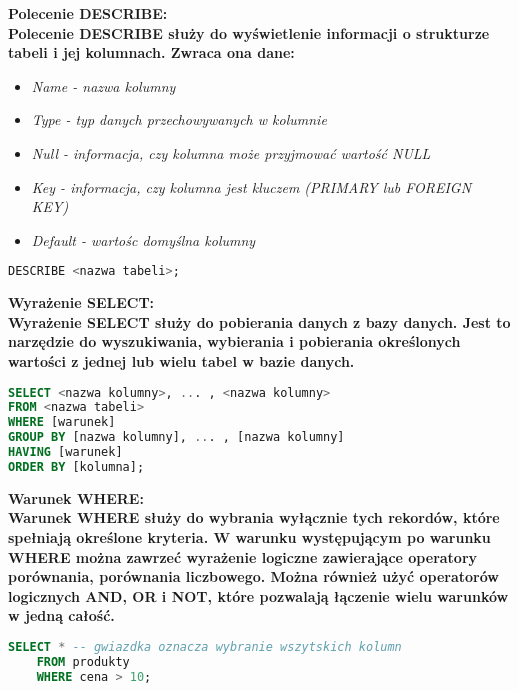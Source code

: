 \documentclass[a4paper,12pt]{article}
\newcommand{\h}[1]{\noindent \bf #1 \rm \\ \noindent}
\newcommand{\italic}[1]{\it #1 \rm}
\begin{document}
\h{Polecenie DESCRIBE:}
Polecenie DESCRIBE służy do wyświetlenie informacji o strukturze tabeli i jej kolumnach. Zwraca ona dane:
\begin{itemize}
	\item \italic{Name} - nazwa kolumny
	\item \italic{Type} - typ danych przechowywanych w kolumnie
	\item \italic{Null} - informacja, czy kolumna może przyjmować wartość NULL
	\item \italic{Key} - informacja, czy kolumna jest kluczem (PRIMARY lub FOREIGN KEY)
	\item \italic{Default} - wartośc domyślna kolumny
\end{itemize}
\vspace{5mm}

\begin{lstlisting}[language=SQL]
DESCRIBE <nazwa tabeli>;
\end{lstlisting}
\vspace{5mm}

\h{Wyrażenie SELECT:}
Wyrażenie SELECT służy do pobierania danych z bazy danych. Jest to narzędzie do wyszukiwania, wybierania i pobierania określonych wartości z jednej lub wielu tabel w bazie danych.
\begin{lstlisting}[language=SQL]
SELECT <nazwa kolumny>, ... , <nazwa kolumny>
FROM <nazwa tabeli>
WHERE [warunek]
GROUP BY [nazwa kolumny], ... , [nazwa kolumny]
HAVING [warunek]
ORDER BY [kolumna];
\end{lstlisting}
\vspace{5mm}

\h{Warunek WHERE:}
Warunek WHERE służy do wybrania wyłącznie tych rekordów, które spełniają określone kryteria. W warunku występującym po warunku WHERE można zawrzeć wyrażenie logiczne zawierające operatory porównania, porównania liczbowego. Można również użyć operatorów logicznych AND, OR i NOT, które pozwalają łączenie wielu warunków w jedną całość.
\begin{lstlisting}[language=SQL]
	SELECT * -- gwiazdka oznacza wybranie wszytskich kolumn
	FROM produkty
	WHERE cena > 10;
\end{lstlisting}
\vspace{5mm}
\end{document}
